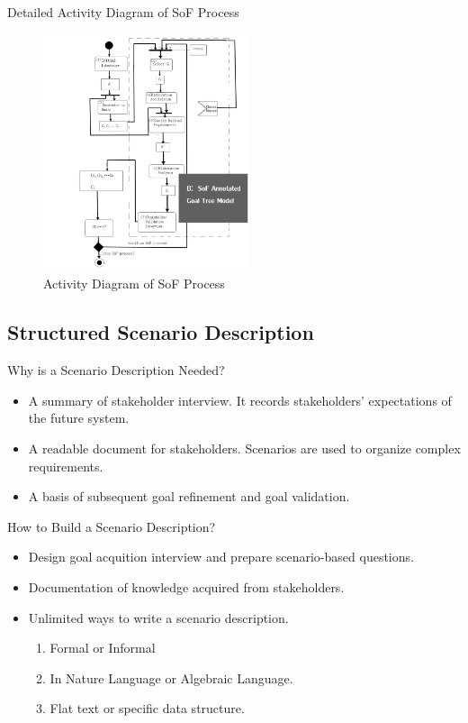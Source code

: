 \documentclass{beamer}
\begin{document}
\begin{frame}{Detailed Activity Diagram of SoF Process}
  \begin{figure}
    \includegraphics[width=2.4in]{img/2_2.PNG}
    \caption{Activity Diagram of SoF Process}
  \end{figure}
\end{frame}  


\subsection{Structured Scenario Description}
\begin{frame}{Why is a Scenario Description Needed?}
  \begin{itemize}
  \item
    A summary of stakeholder interview. \pause It records stakeholders' expectations of the future system.\pause
  \item
    A readable document for stakeholders.  \pause Scenarios are used to organize complex requirements.  \pause
  \item
    A basis of subsequent goal refinement and goal validation. \pause
  \end{itemize}
\end{frame}

\begin{frame}{How to Build a Scenario Description?}
  \begin{itemize}
  \item
    Design goal acquition interview and prepare scenario-based questions.\pause
  \item
    Documentation of knowledge acquired from stakeholders.\pause
  \item
    Unlimited ways to write a scenario description. \pause
    \begin{enumerate}
    \item Formal or Informal   
    \item In Nature Language or Algebraic Language.
    \item Flat text or specific data structure.
    \end{enumerate}
  \end{itemize}
\end{frame}
\end{document}
